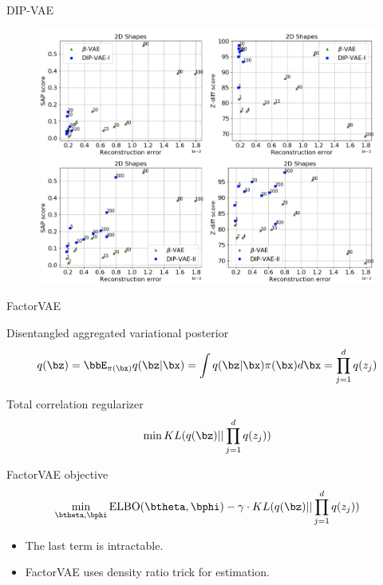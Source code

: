 \begin{frame}{DIP-VAE}
	\begin{figure}
		\centering
		\includegraphics[width=0.9\linewidth]{figs/dip-vae_2}
	\end{figure}

\end{frame}
\begin{frame}{FactorVAE}
	\begin{block}{Disentangled aggregated variational posterior}
		\vspace{-0.3cm}
		\[
		q(\bz) = \bbE_{\pi(\bx)} q(\bz | \bx) = \int q(\bz | \bx) \pi(\bx) d\bx = \prod_{j=1}^d q(z_j)
		\]
		\vspace{-0.3cm}
	\end{block}
	\begin{block}{Total correlation regularizer}
		\vspace{-0.3cm}
		\[
		\min KL(q(\bz) || \prod_{j=1}^d q(z_j))
		\]
		\vspace{-0.3cm}
	\end{block}
	\begin{block}{FactorVAE objective}
		\vspace{-0.3cm}
		\[
		\min_{\btheta, \bphi} \text{ELBO}(\btheta, \bphi) - \gamma \cdot KL(q(\bz) || \prod_{j=1}^d q(z_j))
		\]
		\vspace{-0.3cm}
	\end{block}
	\begin{itemize}
		\item The last term is intractable.
		\item FactorVAE uses density ratio trick for estimation. 
	\end{itemize}

\end{frame}
